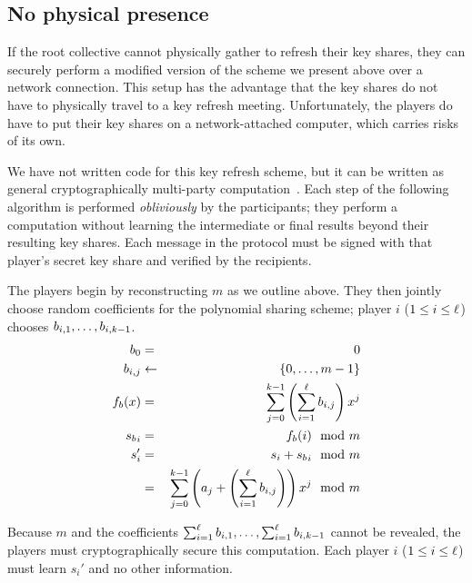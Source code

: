 {\subsection{No physical presence}

If the root collective cannot physically gather to refresh their key
shares, they can securely perform a modified version of the scheme we
present above over a network connection. This setup has the advantage that the key shares do not have to physically travel to a key refresh meeting. Unfortunately, the players do have to put their key shares on a network-attached computer, which carries risks of its own.

We have not written code for this key refresh scheme, but it can be written as general cryptographically multi-party computation~\cite{gbw}. Each step of the following algorithm is performed {\it obliviously} by the participants; they perform a computation without learning the intermediate or final results beyond their resulting key shares. Each message in the
protocol must be signed with that player's secret key share and
verified by the recipients.

The players begin by reconstructing $m$ as we outline above. They then
jointly choose random coefficients for the polynomial sharing scheme;
player $i$ ($1 \leq i \leq \ell$) chooses $b_{i,1},\dots ,
b_{i,k-1}$.
\begin{eqnarray*}
b_0 & = & 0 \\
b_{i,j} & \leftarrow & \{ 0, \dots, m-1\} \\
f_b(x) & = & \sum_{j=0}^{k-1} \left(\sum_{i=1}^{\ell} b_{i,j}\right) x^j \\
{s_b}_i & = & f_b(i) \mod m \\
s_i' & = & s_i + {s_b}_i \mod m \\
     & = & \sum_{j=0}^{k-1} \left(a_j+\left(\sum_{i=1}^{\ell} b_{i,j}\right)\right)x^j \mod m
\end{eqnarray*}

Because $m$ and the coefficients $\sum_{i=1}^{\ell} b_{i,1}, \dots ,
\sum_{i=1}^{\ell} b_{i,k-1}$ cannot be revealed, the players must
cryptographically secure this computation. Each player $i$ ($1 \leq i
\leq \ell$) must learn $s_i'$ and no other information. 
}
